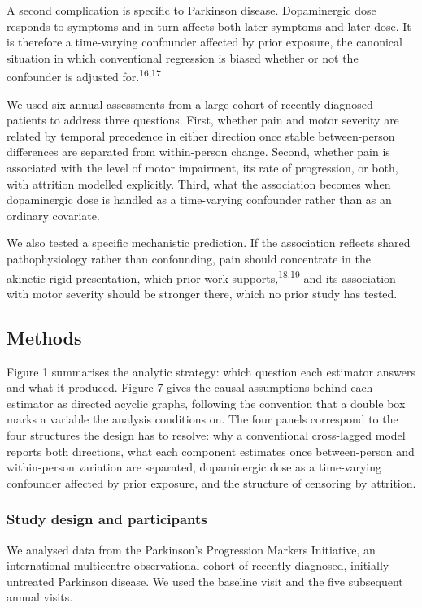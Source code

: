 \documentclass[
  english,
  12pt,
]{article}
\begin{document}
A second complication is specific to Parkinson disease. Dopaminergic dose responds to symptoms and in turn affects both later symptoms and later dose. It is therefore a time-varying confounder affected by prior exposure, the canonical situation in which conventional regression is biased whether or not the confounder is adjusted for.\textsuperscript{16,17}

We used six annual assessments from a large cohort of recently diagnosed patients to address three questions. First, whether pain and motor severity are related by temporal precedence in either direction once stable between-person differences are separated from within-person change. Second, whether pain is associated with the level of motor impairment, its rate of progression, or both, with attrition modelled explicitly. Third, what the association becomes when dopaminergic dose is handled as a time-varying confounder rather than as an ordinary covariate.

We also tested a specific mechanistic prediction. If the association reflects shared pathophysiology rather than confounding, pain should concentrate in the akinetic-rigid presentation, which prior work supports,\textsuperscript{18,19} and its association with motor severity should be stronger there, which no prior study has tested.

\subsection{Methods}\label{methods}

Figure 1 summarises the analytic strategy: which question each estimator answers and what it produced. Figure 7 gives the causal assumptions behind each estimator as directed acyclic graphs, following the convention that a double box marks a variable the analysis conditions on. The four panels correspond to the four structures the design has to resolve: why a conventional cross-lagged model reports both directions, what each component estimates once between-person and within-person variation are separated, dopaminergic dose as a time-varying confounder affected by prior exposure, and the structure of censoring by attrition.

\subsubsection{Study design and participants}\label{study-design-and-participants}

We analysed data from the Parkinson's Progression Markers Initiative, an international multicentre observational cohort of recently diagnosed, initially untreated Parkinson disease. We used the baseline visit and the five subsequent annual visits.
\end{document}
